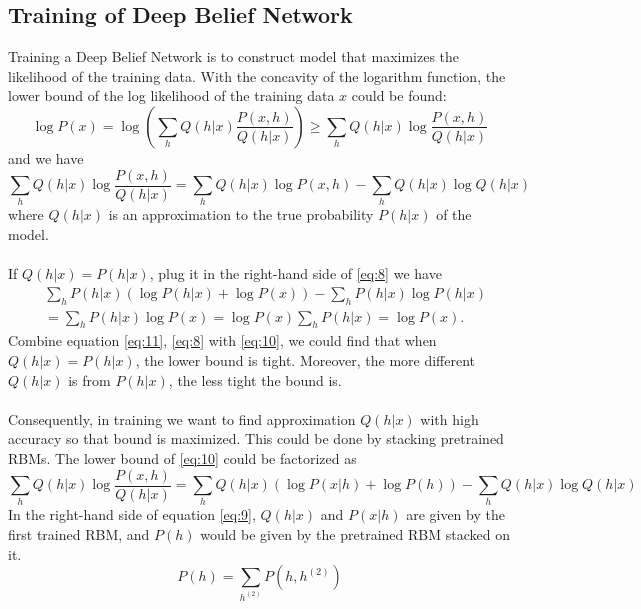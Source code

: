 \documentclass[12pt]{article}
\begin{document}
\subsection{Training of Deep Belief Network}
Training a Deep Belief Network is to construct model that maximizes the likelihood of the training data. With the concavity of the logarithm function, the lower bound of the log likelihood of the training data $x$ could be found:\begin{equation}\label{eq:10}
\log P(x)=\log\left(\sum_h Q(h|x)\frac{P(x,h)}{Q(h|x)}\right)\geq \sum_h Q(h|x)\log\frac{P(x,h)}{Q(h|x)}
\end{equation}
and we have
\begin{equation}\label{eq:8}
\sum_h Q(h|x)\log\frac{P(x,h)}{Q(h|x)}= \sum_h Q(h|x)\log P(x, h)-\sum_h Q(h|x)\log Q(h|x)
\end{equation}
where $Q(h|x)$ is an approximation to the true probability $P(h|x)$ of the model.\\
\\
If $Q(h|x) = P(h|x)$, plug it in the right-hand side of \eqref{eq:8} we have \begin{equation}\label{eq:11}
\begin{split}
&\sum_h P(h|x)(\log P(h|x) + \log P(x))-\sum_h P(h|x)\log P(h|x)\\
& = \sum_h P(h|x)\log P(x) =\log P(x)\sum_h P(h|x) =\log P(x).
\end{split}
\end{equation}
Combine equation \eqref{eq:11}, \eqref{eq:8}  with \eqref{eq:10}, we could find that when $Q(h|x) = P(h|x)$, the lower bound is tight. Moreover, the more different $Q(h|x)$ is from $P(h|x)$, the less tight the bound is.\\
\\
Consequently, in training we want to find approximation $Q(h|x)$ with high accuracy  so that bound is maximized. This could be done by stacking pretrained RBMs. The lower bound of \eqref{eq:10} could be factorized as
\begin{equation}\label{eq:9}
\sum_h Q(h|x)\log\frac{P(x,h)}{Q(h|x)}= \sum_h Q(h|x)(\log P(x|h) + \log P(h))-\sum_h Q(h|x)\log Q(h|x)
\end{equation}
In the right-hand side of equation \eqref{eq:9}, $Q(h|x)$ and $P(x|h)$ are given by the first trained RBM, and $P(h)$ would be given by the pretrained RBM stacked on it. \begin{equation}
P(h) = \sum_{h^{(2)}}P(h, h^{(2)})
\end{equation}
\end{document}
